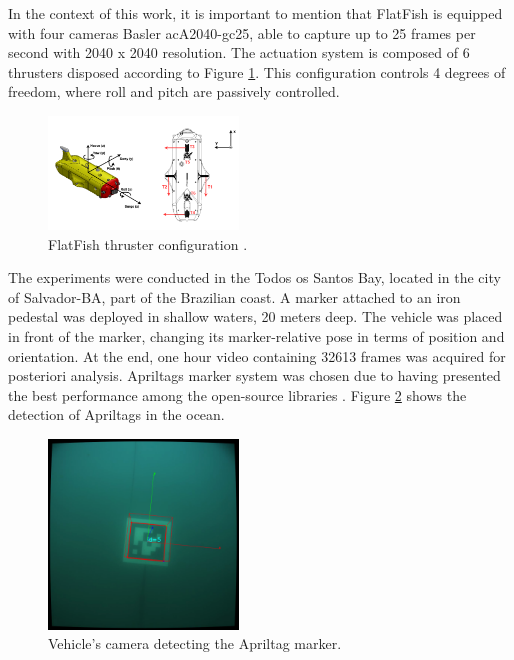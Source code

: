 \documentclass[conference, letterpaper]{IEEEtran}
\begin{document}
In the context of this work, it is important to mention that FlatFish is
equipped with four cameras Basler acA2040-gc25, able to capture up to 25 frames
per second with 2040 x 2040 resolution. The actuation system is composed of 6
thrusters disposed according to Figure \ref{fig:thrusters_configuration}. This
configuration controls 4 degrees of freedom, where roll and pitch are passively
controlled. 

\begin{figure}[!ht]
    \centering
    \includegraphics[width=0.45\textwidth]{./fig/thrust_configuration.png}
    \caption{FlatFish thruster configuration \cite{saback2016}.}
    \label{fig:thrusters_configuration}
\end{figure}

The experiments were conducted in the Todos os Santos Bay, located in the city
of Salvador-BA, part of the Brazilian coast. A marker attached to an iron
pedestal was deployed in shallow waters, 20 meters deep. The vehicle was
placed in front of the marker, changing its marker-relative pose in terms of
position and orientation. At the end, one hour video containing 32613 frames was
acquired for posteriori analysis. Apriltags marker system was chosen due
to having presented the best performance among the open-source libraries
\cite{diego}.  Figure \ref{fig:apriltags_ocean} shows the detection of
Apriltags in the ocean.

\begin{figure}[!htpb]
	\centering
	\includegraphics[width=0.45\textwidth]{./fig/april_ocean3.png}
    \caption{Vehicle's camera detecting the Apriltag marker.}
    \label{fig:apriltags_ocean}
\end{figure}
\end{document}
